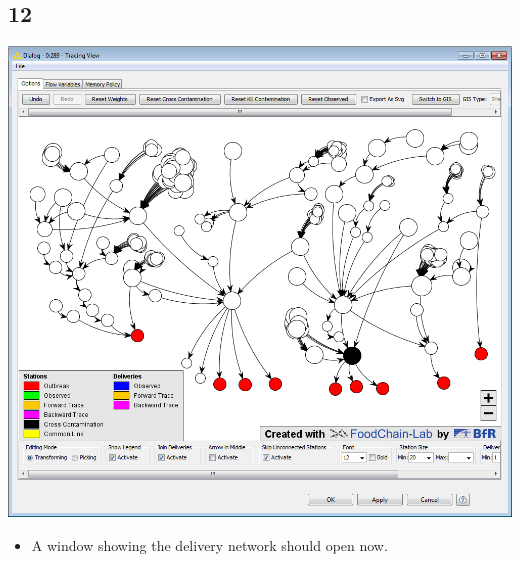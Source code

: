 \documentclass{beamer}
\begin{document}
\subsection{12}
\begin{frame}
	\begin{center}
  		\includegraphics[height=0.6\textheight]{12.png}
	\end{center}
	\begin{itemize}
		\item A window showing the delivery network should open now.
	\end{itemize}
\end{frame}
\end{document}
